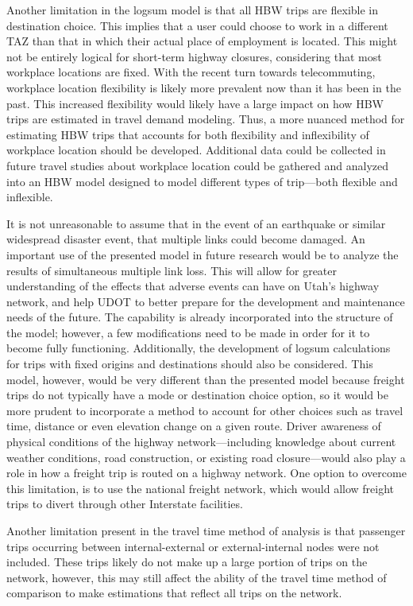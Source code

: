 Another limitation in the logsum model is that all HBW trips are flexible in
destination choice. This implies that a user could choose to work in a different
TAZ than that in which their actual place of employment is located.
This might not be entirely logical for short-term highway closures, considering that
most workplace locations are fixed. With the recent turn towards telecommuting,
workplace location flexibility is likely more prevalent now than it has been in
the past. This increased flexibility would likely have a large impact on how HBW
trips are estimated in travel demand modeling. Thus, a more nuanced method for estimating
HBW trips that accounts
for both flexibility and inflexibility of workplace location should be developed.
Additional data could be collected in future travel
studies about workplace location could be gathered
and analyzed into an HBW model designed to model different types of trip---both flexible and inflexible.

It is not unreasonable to assume that in the event of an earthquake or
similar widespread disaster event, that multiple links could become
damaged. An important use of the presented model in future research would be
to analyze the results of simultaneous multiple link
loss. This will allow for
greater understanding of the effects that adverse events can have on Utah’s
highway network, and help UDOT to better prepare for the development and
maintenance needs of the future. The capability
is already incorporated into the structure of the model; however, a few modifications
need to be made in order for it to become fully functioning.
Additionally, the development of logsum calculations for trips with fixed
origins and destinations should also be considered. This model, however,
would be very different than the presented model because freight trips
do not typically have a mode or destination choice option, so it would be
more prudent to incorporate a method to account for other choices such as travel time,
distance or even elevation change on a given route. Driver awareness of physical
conditions of the highway network---including knowledge about current weather conditions,
road construction, or existing road closure---would also play a role in how a freight trip
is routed on a highway network. One option to overcome this limitation, is to use the national
freight network, which would allow freight trips to divert through other Interstate
facilities.

Another limitation present in the travel time method of analysis is that passenger
trips occurring between internal-external or external-internal nodes were not
included. These trips likely do not make up a large portion of trips on the network,
however, this may still affect the ability of the travel time method of comparison
to make estimations that reflect all trips on the network.

